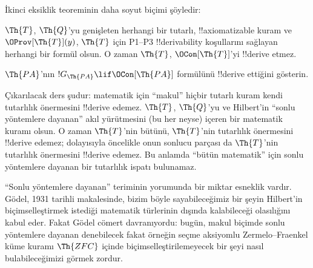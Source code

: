 \documentclass[../../../include/open-logic-section]{subfiles}
\begin{document}
İkinci eksiklik teoreminin daha soyut biçimi şöyledir:

\begin{thm}
 $\Th{T}$, $\Th{Q}$'yu genişleten
herhangi bir tutarlı, !!{axiomatizable} kuram ve $\OProv[\Th{T}](y)$,
$\Th{T}$ için P1--P3 !!{derivability} koşullarını sağlayan herhangi bir formül
olsun. O zaman $\Th{T}$, $\OCon[\Th{T}]$'yi !!{derive} etmez.
\end{thm}

\begin{prob}
$\Th{PA}$'nın $!G_{\Th{PA}} \lif \OCon[\Th{PA}]$ formülünü !!{derive}
ettiğini gösterin.
\end{prob}

\begin{digress}
Çıkarılacak ders şudur: matematik için ``makul'' hiçbir tutarlı kuram kendi
tutarlılık önermesini !!{derive} edemez. $\Th{T}$, $\Th{Q}$'yu ve Hilbert'in
``sonlu yöntemlere dayanan'' akıl yürütmesini (bu her neyse) içeren bir
matematik kuramı olsun. O zaman $\Th{T}$'nin bütünü, $\Th{T}$'nin tutarlılık
önermesini !!{derive} edemez; dolayısıyla öncelikle onun sonlucu parçası da
$\Th{T}$'nin tutarlılık önermesini !!{derive} edemez. Bu anlamda ``bütün
matematik'' için sonlu yöntemlere dayanan bir tutarlılık ispatı bulunamaz.

``Sonlu yöntemlere dayanan'' teriminin yorumunda bir miktar esneklik vardır.
G\"odel, 1931 tarihli makalesinde, bizim böyle sayabileceğimiz bir şeyin
Hilbert'in biçimselleştirmek istediği matematik türlerinin dışında kalabileceği
olasılığını kabul eder. Fakat G\"odel cömert davranıyordu: bugün, makul biçimde
sonlu yöntemlere dayanan denebilecek fakat örneğin seçme aksiyomlu
Zermelo--Fraenkel küme kuramı $\Th{ZFC}$ içinde biçimselleştirilemeyecek bir
şeyi nasıl bulabileceğimizi görmek zordur.
\end{digress}
\end{document}
